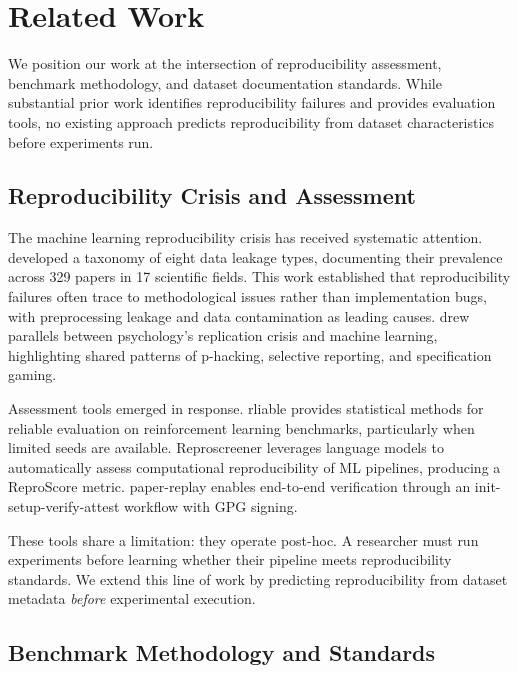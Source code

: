 \section{Related Work}
\label{sec:related}

We position our work at the intersection of reproducibility assessment, benchmark methodology, and dataset documentation standards. While substantial prior work identifies reproducibility failures and provides evaluation tools, no existing approach predicts reproducibility from dataset characteristics before experiments run.

\subsection{Reproducibility Crisis and Assessment}

The machine learning reproducibility crisis has received systematic attention. \citet{kapoor2022leakage} developed a taxonomy of eight data leakage types, documenting their prevalence across 329 papers in 17 scientific fields. This work established that reproducibility failures often trace to methodological issues rather than implementation bugs, with preprocessing leakage and data contamination as leading causes. \citet{hullman2022worst} drew parallels between psychology's replication crisis and machine learning, highlighting shared patterns of p-hacking, selective reporting, and specification gaming.

Assessment tools emerged in response. rliable \citep{agarwal2021deep} provides statistical methods for reliable evaluation on reinforcement learning benchmarks, particularly when limited seeds are available. Reproscreener \citep{bhaskar2024reproscreener} leverages language models to automatically assess computational reproducibility of ML pipelines, producing a ReproScore metric. paper-replay enables end-to-end verification through an init-setup-verify-attest workflow with GPG signing.

These tools share a limitation: they operate post-hoc. A researcher must run experiments before learning whether their pipeline meets reproducibility standards. We extend this line of work by predicting reproducibility from dataset metadata \emph{before} experimental execution.

\subsection{Benchmark Methodology and Standards}

